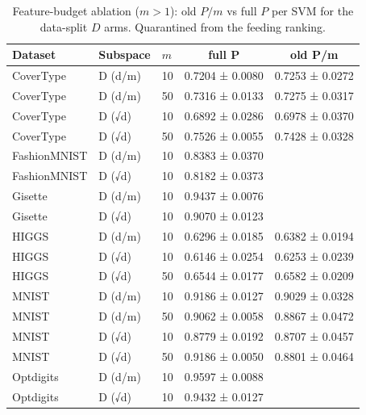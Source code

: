 \begin{table}[ht]
\centering\small
\begin{tabular}{lllcc}
\toprule
Dataset & Subspace & $m$ & full P & old P/m \\
\midrule
CoverType & D (d/m) & 10 & 0.7204 ± 0.0080 & 0.7253 ± 0.0272 \\
CoverType & D (d/m) & 50 & 0.7316 ± 0.0133 & 0.7275 ± 0.0317 \\
CoverType & D (√d) & 10 & 0.6892 ± 0.0286 & 0.6978 ± 0.0370 \\
CoverType & D (√d) & 50 & 0.7526 ± 0.0055 & 0.7428 ± 0.0328 \\
FashionMNIST & D (d/m) & 10 & 0.8383 ± 0.0370 &  \\
FashionMNIST & D (√d) & 10 & 0.8182 ± 0.0373 &  \\
Gisette & D (d/m) & 10 & 0.9437 ± 0.0076 &  \\
Gisette & D (√d) & 10 & 0.9070 ± 0.0123 &  \\
HIGGS & D (d/m) & 10 & 0.6296 ± 0.0185 & 0.6382 ± 0.0194 \\
HIGGS & D (√d) & 10 & 0.6146 ± 0.0254 & 0.6253 ± 0.0239 \\
HIGGS & D (√d) & 50 & 0.6544 ± 0.0177 & 0.6582 ± 0.0209 \\
MNIST & D (d/m) & 10 & 0.9186 ± 0.0127 & 0.9029 ± 0.0328 \\
MNIST & D (d/m) & 50 & 0.9062 ± 0.0058 & 0.8867 ± 0.0472 \\
MNIST & D (√d) & 10 & 0.8779 ± 0.0192 & 0.8707 ± 0.0457 \\
MNIST & D (√d) & 50 & 0.9186 ± 0.0050 & 0.8801 ± 0.0464 \\
Optdigits & D (d/m) & 10 & 0.9597 ± 0.0088 &  \\
Optdigits & D (√d) & 10 & 0.9432 ± 0.0127 &  \\
\bottomrule
\end{tabular}
\caption{Feature-budget ablation ($m>1$): old $P/m$ vs full $P$ per SVM for the data-split $D$ arms. Quarantined from the feeding ranking.}
\label{tab:budget}
\end{table}
